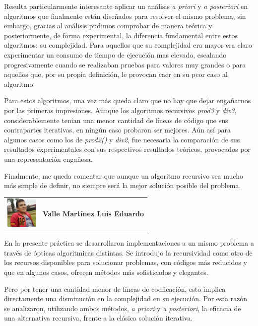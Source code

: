 \documentclass{report}
\begin{document}
    Resulta particularmente interesante aplicar un análisis \textit{a priori} y \textit{a posteriori} en algoritmos que finalmente están diseñados para resolver el mismo problema, sin embargo, gracias al análisis pudimos comprobar de manera teórica y posteriormente, de forma experimental, la diferencia fundamental entre estos algoritmos: su complejidad. Para aquellos que su complejidad era mayor era claro experimentar un consumo de tiempo de ejecución mas elevado, escalando progresivamente cuando se realizaban pruebas para valores muy grandes o para aquellos que, por su propia definición, le provocan caer en su peor caso al algoritmo.
    
    Para estos algoritmos, una vez más queda claro que no hay que dejar engañarnos por las primeras impresiones. Aunque los algoritmos recursivos \textit{prod3} y \textit{div3}, considerablemente tenian una menor cantidad de líneas de código que sus contrapartes iterativas, en ningún caso probaron ser mejores. Aún así para algunos casos como los de \textit{prod2()} y \textit{div2}, fue necesaria la comparación de sus resultados experimentales con sus respectivos resultados teóricos, provocados por una representación engañosa.
    
    Finalmente, me queda comentar que aunque un algoritmo recursivo sea mucho más simple de definir, no siempre será la mejor solución posible del problema.
    \hfill \break
    \hfill \break
    
    \begin{tabular}{l l}
        \multirow{3}{*}{\includegraphics[width=1.5cm]{Imagenes/lalo.jpg}}  &  \\
        & \textbf{Valle Mart\'inez Luis Eduardo} \\
        & \\
    \end{tabular}
    
    \vspace*{3\baselineskip}
    En la presente práctica se desarrollaron implementaciones a un mismo problema a través de ópticas algoritmicas distintas. Se introdujo la recursividad como otro de los recursos disponibles para solucionar problemas, con códigos más reducidos y que en algunos casos, ofrecen métodos más sofisticados y elegantes.
    
    Pero por tener una cantidad menor de líneas de codficación, esto implica directamente una disminución en la complejidad en su ejecución. Por esta razón se analizaron, utilizando ambos métodos, \textit{a priori} y \textit{a posteriori}, la eficacia de una alternativa recursiva, frente a la clásica solución iterativa.\\
    
\end{document}
